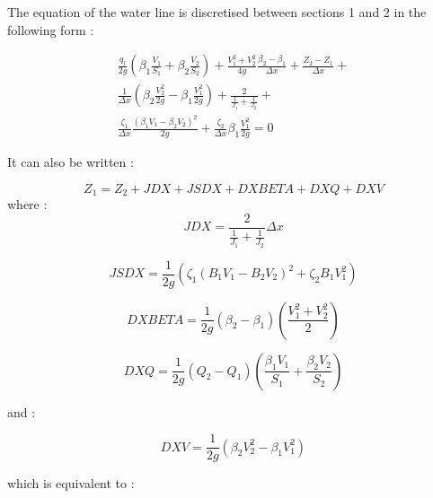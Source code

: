 \vspace{0.5cm}

The equation of the water line is discretised between sections 1 and 2 in the following form :

\begin{eqnarray}
  \frac{q_l}{2 g} \left ( \beta_1 \frac{V_1}{S_1} + \beta_2 \frac{V_2}{S_2} \right ) + \frac{V_{1}^2+V_{2}^2}{4 g} \frac{\beta_2 - \beta_1}{\Delta x} + \frac{Z_2-Z_1}{\Delta x} + \nonumber \\ 
  \frac{1}{\Delta x} \left ( \beta_2 \frac{V_{2}^2}{2 g} - \beta_1 \frac{V_{1}^2}{2 g}  \right ) + \frac{2}{\displaystyle \frac{1}{J_1}+\frac{1}{J_2}} + \nonumber \\ 
  \frac{\zeta_1}{\Delta x} \frac{\left ( \beta_1 V_1 - \beta_2 V_2 \right ) ^2 }{2 g} + \frac{\zeta_2}{\Delta x} \beta_1 \frac{V_{1}^2}{2 g} = 0
  \label{Dyn5}
\end{eqnarray}

\vspace{0.5cm}

It can also be written :

\begin{equation}
  Z_1 = Z_2 + JDX + JSDX + DXBETA + DXQ + DXV
\end{equation}
where :
\begin{equation}
  JDX = \frac{2}{\displaystyle \frac{1}{J_1} + \frac{1}{J_2}} \Delta x
\end{equation}

\begin{equation}
  JSDX = \frac{1}{2 g} \left ( \zeta_1 \left ( B_1 V_1 - B_2 V_2 \right )^2 + \zeta_2 B_1 V_{1}^2 \right )
\end{equation}

\begin{equation}
  DXBETA = \frac{1}{2 g}(\beta_2 - \beta_1) \left ( \frac{V_{1}^2 + V_{2}^2}{2} \right )
\end{equation}

\begin{equation}
  DXQ = \frac{1}{2 g}(Q_2 - Q_1) \left ( \frac{\beta_1 V_1}{S_1} + \frac{\beta_2 V_2}{S_2} \right )
\end{equation}

and :

\begin{equation}
  DXV = \frac{1}{2 g} ( \beta_2 V_{2}^2 - \beta_1 V_{1}^2 )
\end{equation}

which is equivalent to :

